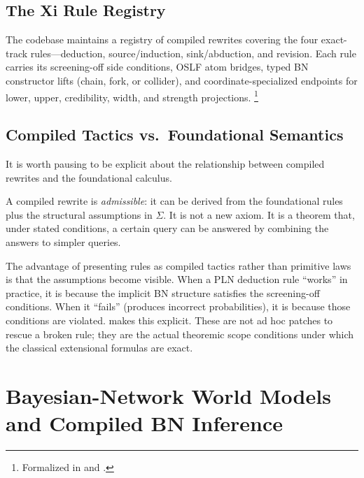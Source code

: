 \documentclass[11pt,openany]{report}
\begin{document}
\section{The Xi Rule Registry}

The codebase maintains a registry of compiled rewrites covering the four
exact-track rules---deduction, source/induction, sink/abduction, and
revision.  Each rule carries its screening-off side conditions, OSLF atom
bridges, typed BN constructor lifts (chain, fork, or collider), and
coordinate-specialized endpoints for lower, upper, credibility, width,
and strength projections.%
\footnote{Formalized in  and
  .}

\section{Compiled Tactics vs.\ Foundational Semantics}

It is worth pausing to be explicit about the relationship between compiled
rewrites and the foundational calculus.

A compiled rewrite is \emph{admissible}: it can be derived from the
foundational rules plus the structural assumptions in $\Sigma$.  It is
not a new axiom.  It is a theorem that, under stated conditions, a certain
query can be answered by combining the answers to simpler queries.

The advantage of presenting rules as compiled tactics rather than primitive
laws is that the assumptions become visible.  When a PLN deduction rule
``works'' in practice, it is because the implicit BN structure satisfies
the screening-off conditions.  When it ``fails'' (produces incorrect
probabilities), it is because those conditions are violated.  \xiPLN{}
makes this explicit.  These are not ad hoc patches to rescue a broken
rule; they are the actual theoremic scope conditions under which the
classical extensional formulas are exact.


\chapter{Bayesian-Network World Models and Compiled BN Inference}
\label{ch:bn-models}
\end{document}
